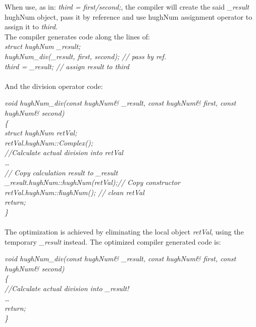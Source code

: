 \documentclass{article}
\begin{document}
 When use, as in:
 \emph{ 
 third = first/second;},
 the compiler will create the said \emph{\_result} hughNum object, pass it by reference and use hughNum assignment operator to assign it to \emph{third}. \\

 The compiler generates code along the lines of:\\
 \emph{
 struct hughNum \_result;            \\
 hughNum\_div(\_result, first, second);        // pass by ref. \\
 third = \_result;                      // assign result to third \\
 } \\
 And the division operator code:

 \emph{
 void hughNum\_div(const hughNum\& \_result,
                 const hughNum\& first,
                 const hughNum\& second)\\
 \{\\
     struct hughNum retVal;\\
     retVal.hughNum::Complex();            \\
 //Calculate actual division into retVal \\
 \ldots\\
 // Copy calculation result to \_result\\
     \_result.hughNum::hughNum(retVal);// Copy constructor\\
    retVal.hughNum::\~hughNum();              // clean retVal\\
     return; \\
 \}
 }\\                                      

 \paragraph{}
 The optimization is achieved by eliminating the local object \emph{retVal}, using the temporary \emph{\_result} instead. The optimized compiler generated code is:

 \emph{
 void hughNum\_div(const hughNum\& \_result,
                 const hughNum\& first,
                 const hughNum\& second)\\
 \{\\
%     
     //Calculate actual division into \_result! \\
 \ldots\\
 return; \\
 \}
 }
\end{document}
